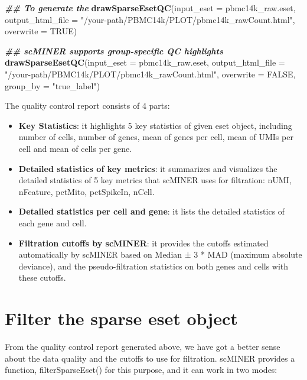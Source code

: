 \documentclass[
  12pt,
]{book}
\newenvironment{Shaded}{\begin{snugshade}}{\end{snugshade}}
\newcommand{\AttributeTok}[1]{\textcolor[rgb]{0.13,0.29,0.53}{#1}}
\newcommand{\ConstantTok}[1]{\textcolor[rgb]{0.56,0.35,0.01}{#1}}
\newcommand{\DocumentationTok}[1]{\textcolor[rgb]{0.56,0.35,0.01}{\textbf{\textit{#1}}}}
\newcommand{\FunctionTok}[1]{\textcolor[rgb]{0.13,0.29,0.53}{\textbf{#1}}}
\newcommand{\NormalTok}[1]{#1}
\newcommand{\StringTok}[1]{\textcolor[rgb]{0.31,0.60,0.02}{#1}}
\providecommand{\tightlist}{%
  \setlength{\itemsep}{0pt}\setlength{\parskip}{0pt}}
\begin{document}
\begin{Shaded}
\begin{Highlighting}[]
\DocumentationTok{\#\# To generate the }
\FunctionTok{drawSparseEsetQC}\NormalTok{(}\AttributeTok{input\_eset =}\NormalTok{ pbmc14k\_raw.eset, }\AttributeTok{output\_html\_file =} \StringTok{"/your{-}path/PBMC14k/PLOT/pbmc14k\_rawCount.html"}\NormalTok{, }\AttributeTok{overwrite =} \ConstantTok{TRUE}\NormalTok{)}

\DocumentationTok{\#\# scMINER supports group{-}specific QC highlights}
\FunctionTok{drawSparseEsetQC}\NormalTok{(}\AttributeTok{input\_eset =}\NormalTok{ pbmc14k\_raw.eset, }\AttributeTok{output\_html\_file =} \StringTok{"/your{-}path/PBMC14k/PLOT/pbmc14k\_rawCount.html"}\NormalTok{, }\AttributeTok{overwrite =} \ConstantTok{FALSE}\NormalTok{, }\AttributeTok{group\_by =} \StringTok{"true\_label"}\NormalTok{)}
\end{Highlighting}
\end{Shaded}

The quality control report consists of 4 parts:

\begin{itemize}
\tightlist
\item
  \textbf{Key Statistics}: it highlights 5 key statistics of given eset object, including number of cells, number of genes, mean of genes per cell, mean of UMIs per cell and mean of cells per gene.
\item
  \textbf{Detailed statistics of key metrics}: it summarizes and visualizes the detailed statistics of 5 key metrics that scMINER uses for filtration: nUMI, nFeature, pctMito, pctSpikeIn, nCell.
\item
  \textbf{Detailed statistics per cell and gene}: it lists the detailed statistics of each gene and cell.
\item
  \textbf{Filtration cutoffs by scMINER}: it provides the cutoffs estimated automatically by scMINER based on Median ± 3 * MAD (maximum absolute deviance), and the pseudo-filtration statistics on both genes and cells with these cutoffs.
\end{itemize}

\section{Filter the sparse eset object}\label{filter-the-sparse-eset-object}

From the quality control report generated above, we have got a better sense about the data quality and the cutoffs to use for filtration. scMINER provides a function, filterSparseEset() for this purpose, and it can work in two modes:
\end{document}
